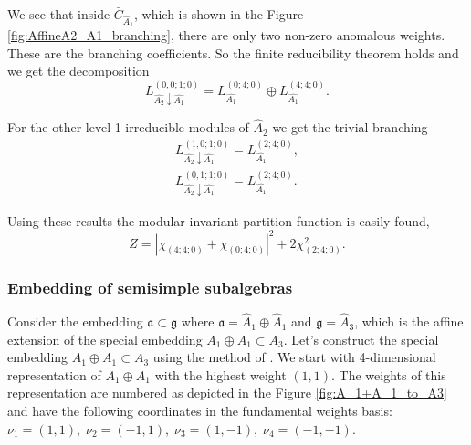 \documentclass[a4paper,12pt]{article}
\theoremstyle{definition} \newtheorem{Def}{Definition}
\begin{document}
We see that inside $\bar{C}_{\hat{A}_1}$, which is shown in the Figure \ref{fig:AffineA2_A1_branching}, there are only two non-zero anomalous weights. These are the branching coefficients. So the finite reducibility theorem holds and we get the decomposition
\begin{equation}
  \label{eq:43}
  L^{(0,0;1;0)}_{\hat{A_2}\downarrow \hat{A_1}}= L_{\hat{A_1}}^{(0;4;0)}\oplus L_{\hat{A_1}}^{(4;4;0)}.
\end{equation}

For the other level 1 irreducible modules of $\hat{A}_2$ we get the trivial
branching 
\begin{eqnarray}
  \label{eq:44}
   L^{(1,0;1;0)}_{\hat{A_2}\downarrow \hat{A_1}}= L_{\hat{A_1}}^{(2;4;0)},\\
   L^{(0,1;1;0)}_{\hat{A_2}\downarrow \hat{A_1}}= L_{\hat{A_1}}^{(2;4;0)}.
\end{eqnarray}

Using these results the modular-invariant partition function is easily found,
\begin{equation}
  \label{eq:45}
  Z=\left|\chi_{(4;4;0)}+\chi_{(0;4;0)}\right|^2+2\chi_{(2;4;0)}^2.
\end{equation}

\subsubsection{Embedding of semisimple subalgebras}
\label{sec:embedd-semis-subalg}

Consider the embedding $\mathfrak{a}\subset \mathfrak{g}$ where $\mathfrak{a}=\hat A_1\oplus \hat A_1$ and $\mathfrak{g}= \hat A_3$, which is the affine extension of the special embedding $A_1\oplus A_1\subset A_3$. Let's construct the special embedding $A_1\oplus A_1\subset A_3$ using the method of \cite{vasilevich1986method}. We start with 4-dimensional representation of $A_1\oplus A_1$ with the highest weight $(1,1)$. The weights of this representation are numbered as depicted in the Figure \ref{fig:A_1+A_1_to_A3} and have the following coordinates in the fundamental weights basis: $\nu_1=(1,1),\; \nu_2=(-1,1),\; \nu_3=(1,-1),\; \nu_4=(-1,-1)$.
\end{document}
